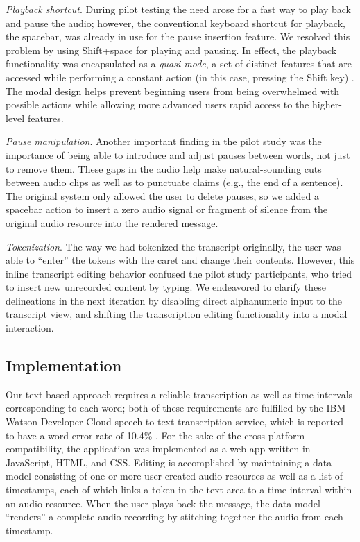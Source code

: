 \emph{Playback shortcut}.
During pilot testing the need arose for a fast way to play back and pause the audio; however, the conventional keyboard shortcut for playback, the spacebar, was already in use for the pause insertion feature.
We resolved this problem by using Shift+space for playing and pausing.
In effect, the playback functionality was encapsulated as a \emph{quasi-mode}, a set of distinct features that are accessed while performing a constant action (in this case, pressing the Shift key) \cite{raskin}. 
The modal design helps prevent beginning users from being overwhelmed with possible actions while allowing more advanced users rapid access to the higher-level features.

\emph{Pause manipulation}.
Another important finding in the pilot study was the importance of being able to introduce and adjust pauses between words, not just to remove them. 
These gaps in the audio help make natural-sounding cuts between audio clips as well as to punctuate claims (e.g., the end of a sentence). 
The original system only allowed the user to delete pauses, so we added a spacebar action to insert a zero audio signal or fragment of silence from the original audio resource into the rendered message. 

\emph{Tokenization}. 
The way we had tokenized the transcript originally, the user was able to ``enter'' the tokens with the caret and change their contents.
However, this inline transcript editing behavior confused the pilot study participants, who tried to insert new unrecorded content by typing. 
We endeavored to clarify these delineations in the next iteration by disabling direct alphanumeric input to the transcript view, and shifting the transcription editing functionality into a modal interaction.

\subsection{Implementation}
Our text-based approach requires a reliable transcription as well as time intervals corresponding to each word; both of these requirements are fulfilled by the IBM Watson Developer Cloud speech-to-text transcription service, which is reported to have a word error rate of 10.4\% \cite{soltau:2014}.
For the sake of the cross-platform compatibility, the application was implemented as a web app written in JavaScript, HTML, and CSS.
Editing is accomplished by maintaining a data model consisting of one or more user-created audio resources as well as a list of timestamps, each of which links a token in the text area to a time interval within an audio resource. 
When the user plays back the message, the data model ``renders'' a complete audio recording by stitching together the audio from each timestamp. 
